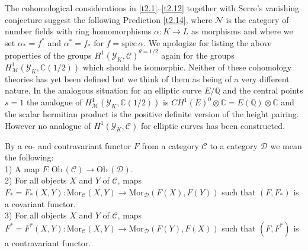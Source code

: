 \documentclass[12pt,leqno]{article}
\newcommand{\C}{{\mathbb{C}}}
\newcommand{\Q}{{\mathbb{Q}}}
\newcommand{\Mor}{\mathrm{Mor}}
\newcommand{\spec}{\mathrm{spec}\,}
\newcommand{\Ob}{\mathrm{Ob}\,}
\newcommand{\Ch}{{\mathcal C}}
\newcommand{\Dh}{\mathcal{D}}
\newcommand{\Mh}{{\mathcal M}}
\newcommand{\Nh}{{\mathcal N}}
\newcommand{\Yh}{\mathcal{Y}}
\begin{document}
The cohomological considerations in \ref{t2.1}--\ref{t2.12} together with Serre's vanishing conjecture suggest the following Prediction \ref{t2.14}, where $\Nh$ is the  category of number fields with ring homomorphisms $\alpha : K \to L$ as morphisms and where we set $\alpha_* = f^*$ and $\alpha^* = f_*$ for $f = \overline{\spec} \alpha$. We apologize for listing the above properties of the groups $H^1 (\Yh_K , \Ch)^{\theta = 1/2}$ again for the groups $H^1_{\Mh} (\Yh_K , \C (1/2))$ which should be isomorphic. Neither of these cohomology theories has yet been defined but we think of them as being of a very different nature. In the analogous situation for an elliptic curve $E / \Q$ and the central points $s = 1$ the analogue of $H^1_{\Mh} (\Yh_K , \C (1/2))$ is $CH^1 (E)^0 \otimes \C = E (\Q) \otimes \C$ and the scalar hermitian product is the positive definite version of the height pairing. However no analogue of $H^1 (\Yh_K , \Ch)$ for elliptic curves has been constructed. 

By a co- and contravariant functor $F$ from a category $\Ch$ to a category $\Dh$ we mean the following:\\
1) A map $F : \Ob (\Ch) \to \Ob (\Dh)$.\\
2) For all objects $X$ and $Y$ of $\Ch$, maps $F_* = F_* (X,Y) : \Mor_{\Ch} (X,Y) \to \Mor_{\Dh} (F (X) , F (Y))$ such that $(F , F_*)$ is a covariant functor.\\
3) For all objects $X$ and $Y$ of $\Ch$, maps $F^* = F^* (X,Y) : \Mor_{\Ch} (X,Y) \to \Mor_{\Dh} (F (Y) , F (X))$ such that $(F , F^*)$ is a contravariant functor.
\end{document}
